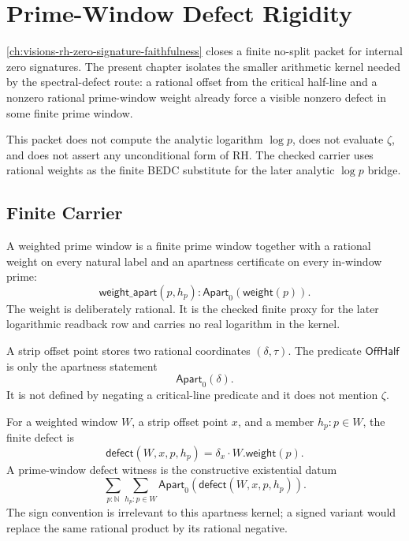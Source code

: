 \chapter{Prime-Window Defect Rigidity}
\label{ch:visions-rh-prime-window-defect}

\autoref{ch:visions-rh-zero-signature-faithfulness} closes a finite
no-split packet for internal zero signatures. The present chapter isolates
the smaller arithmetic kernel needed by the spectral-defect route: a
rational offset from the critical half-line and a nonzero rational
prime-window weight already force a visible nonzero defect in some finite
prime window.

This packet does not compute the analytic logarithm $\log p$, does not
evaluate $\zeta$, and does not assert any unconditional form of RH. The
checked carrier uses rational weights as the finite BEDC substitute for
the later analytic $\log p$ bridge.

\section{Finite Carrier}
\label{sec:rh-prime-window-defect-carrier}

\begin{definition}
\label{def:rh-weighted-prime-window}
A weighted prime window is a finite prime window together with a rational
weight on every natural label and an apartness certificate on every
in-window prime:
$$
\mathsf{weight\_apart}(p,h_p):
\mathsf{Apart}_0(\mathsf{weight}(p)).
$$
The weight is deliberately rational. It is the checked finite proxy for
the later logarithmic readback row and carries no real logarithm in the
kernel.
\end{definition}

\begin{definition}
\label{def:rh-strip-offset-point}
A strip offset point stores two rational coordinates $(\delta,\tau)$.
The predicate $\mathsf{OffHalf}$ is only the apartness statement
$$
\mathsf{Apart}_0(\delta).
$$
It is not defined by negating a critical-line predicate and it does not
mention $\zeta$.
\end{definition}

\begin{definition}
\label{def:rh-prime-window-defect-witness}
For a weighted window $W$, a strip offset point $x$, and a member
$h_p:p\in W$, the finite defect is
$$
\mathsf{defect}(W,x,p,h_p)
=
\delta_x\cdot W.\mathsf{weight}(p).
$$
A prime-window defect witness is the constructive existential datum
$$
\sum_{p:\mathbb N}
\sum_{h_p:p\in W}
\mathsf{Apart}_0(\mathsf{defect}(W,x,p,h_p)).
$$
The sign convention is irrelevant to this apartness kernel; a signed
variant would replace the same rational product by its rational negative.
\end{definition}

